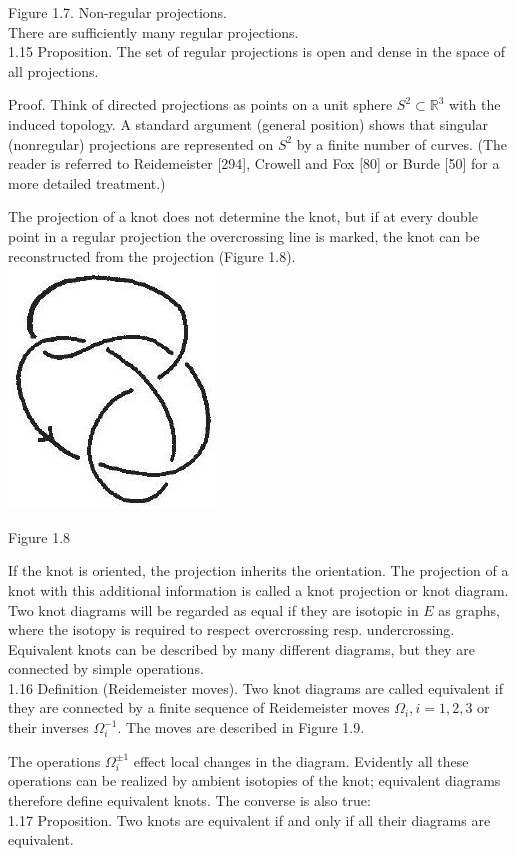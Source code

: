 \documentclass[10pt, letterpaper]{article}
\begin{document}
Figure 1.7. Non-regular projections.\\
There are sufficiently many regular projections.\\
1.15 Proposition. The set of regular projections is open and dense in the space of all projections.

Proof. Think of directed projections as points on a unit sphere $S^{2} \subset \mathbb{R}^{3}$ with the induced topology. A standard argument (general position) shows that singular (nonregular) projections are represented on $S^{2}$ by a finite number of curves. (The reader is referred to Reidemeister [294], Crowell and Fox [80] or Burde [50] for a more detailed treatment.)

The projection of a knot does not determine the knot, but if at every double point in a regular projection the overcrossing line is marked, the knot can be reconstructed from the projection (Figure 1.8).\\
\includegraphics[scale=0.2, center]{2025_05_21_9c06be8de7a55410f8c1g-024}

Figure 1.8

If the knot is oriented, the projection inherits the orientation. The projection of a knot with this additional information is called a knot projection or knot diagram. Two knot diagrams will be regarded as equal if they are isotopic in $E$ as graphs, where the isotopy is required to respect overcrossing resp. undercrossing. Equivalent knots can be described by many different diagrams, but they are connected by simple operations.\\
1.16 Definition (Reidemeister moves). Two knot diagrams are called equivalent if they are connected by a finite sequence of Reidemeister moves $\Omega_{i}, i=1,2,3$ or their inverses $\Omega_{i}^{-1}$. The moves are described in Figure 1.9.

The operations $\Omega_{i}^{ \pm 1}$ effect local changes in the diagram. Evidently all these operations can be realized by ambient isotopies of the knot; equivalent diagrams therefore define equivalent knots. The converse is also true:\\
1.17 Proposition. Two knots are equivalent if and only if all their diagrams are equivalent.
\end{document}
